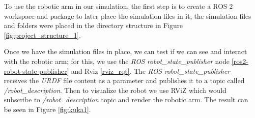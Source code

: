 \documentclass[12pt,oneside]{article}
\begin{document}
To use the robotic arm in our simulation, the first step is to create a ROS 2 workspace and package to later place the simulation files in it; the simulation files and folders were placed in the directory structure in Figure \ref{fig:project_structure_1}.

Once we have the simulation files in place, we can test if we can see and interact with the robotic arm; for this, we use the \textit{ROS robot\_state\_publisher} node \ref{ros2-robot-state-publisher} and Rviz \ref{rviz_rqt}. The \textit{ROS robot\_state\_publisher} receives the \textit{URDF} file content as a parameter and publishes it to a topic called \textit{/robot\_description}. Then to visualize the robot we use RViZ which would subscribe to \textit{/robot\_description} topic and render the robotic arm. The result can be seen in Figure \ref{fig:kuka1}.
\end{document}

